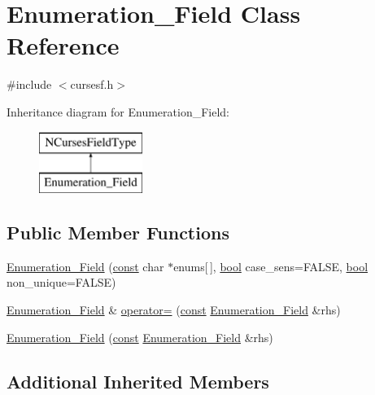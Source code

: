 \hypertarget{class_enumeration___field}{\section{Enumeration\-\_\-\-Field Class Reference}
\label{class_enumeration___field}
}


{\ttfamily \#include $<$cursesf.\-h$>$}

Inheritance diagram for Enumeration\-\_\-\-Field\-:\begin{figure}[H]
\begin{center}
\leavevmode
\includegraphics[height=2.000000cm]{class_enumeration___field}
\end{center}
\end{figure}
\subsection*{Public Member Functions}
\begin{DoxyCompactItemize}
\item 
\hyperlink{class_enumeration___field_a96a8ba576cee0754c8b524d66777199c}{Enumeration\-\_\-\-Field} (\hyperlink{term__entry_8h_a57bd63ce7f9a353488880e3de6692d5a}{const} char $\ast$enums\mbox{[}$\,$\mbox{]}, \hyperlink{term__entry_8h_a002004ba5d663f149f6c38064926abac}{bool} case\-\_\-sens=F\-A\-L\-S\-E, \hyperlink{term__entry_8h_a002004ba5d663f149f6c38064926abac}{bool} non\-\_\-unique=F\-A\-L\-S\-E)
\item 
\hyperlink{class_enumeration___field}{Enumeration\-\_\-\-Field} \& \hyperlink{class_enumeration___field_a061ab0a4ad9c1564310f4a9022f2183a}{operator=} (\hyperlink{term__entry_8h_a57bd63ce7f9a353488880e3de6692d5a}{const} \hyperlink{class_enumeration___field}{Enumeration\-\_\-\-Field} \&rhs)
\item 
\hyperlink{class_enumeration___field_a19fd8e8981bfde776646048d7f8a110a}{Enumeration\-\_\-\-Field} (\hyperlink{term__entry_8h_a57bd63ce7f9a353488880e3de6692d5a}{const} \hyperlink{class_enumeration___field}{Enumeration\-\_\-\-Field} \&rhs)
\end{DoxyCompactItemize}
\subsection*{Additional Inherited Members}


